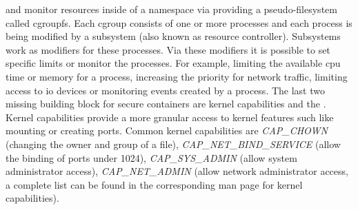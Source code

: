 \documentclass[titlepage]{report}
\begin{document}
and monitor resources inside of a namespace via providing a pseudo-filesystem called cgroupfs\cite{mancgroups}. Each \gls{cgroup} consists
of one or more processes and each process is being modified by a subsystem (also known as resource controller). Subsystems work as modifiers
for these processes. Via these modifiers it is possible to set specific limits or monitor the processes. For example, limiting the available
\gls{cpu} time or memory for a process, increasing the priority for network traffic, limiting access to \gls{io} devices or
monitoring events created by a process\cite{mancgroups}. The last two missing building block for secure containers are kernel capabilities and the .
Kernel capabilities provide a more granular access to kernel features such like mounting or creating ports\cite{dockersecurity}.
Common kernel capabilities are \emph{CAP\_CHOWN} (changing the owner and group of a file), \emph{CAP\_NET\_BIND\_SERVICE} (allow the binding of ports under 1024), 
\emph{CAP\_SYS\_ADMIN} (allow system administrator access), \emph{CAP\_NET\_ADMIN} (allow network administrator access, a complete list can be found
in the corresponding man page for kernel capabilities\cite{mancapabilities}).
\end{document}
